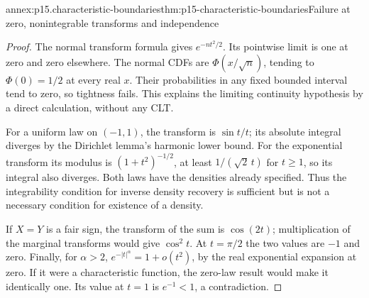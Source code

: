 \begin{annexitem}{annex:p15.characteristic-boundaries}{thm:p15-characteristic-boundaries}{Failure at zero, nonintegrable transforms and independence}
\begin{proof}
The normal transform formula gives \(e^{-nt^2/2}\).
Its pointwise limit is one at zero and zero elsewhere.
The normal CDFs are \(\Phi(x/\sqrt n)\), tending
to \(\Phi(0)=1/2\) at every real \(x\).
Their probabilities in any fixed bounded interval
tend to zero, so tightness fails. This explains
the limiting continuity hypothesis by a direct
calculation, without any CLT.

For a uniform law on \((-1,1)\), the transform is
\(\sin t/t\); its absolute integral diverges by
the Dirichlet lemma's harmonic lower bound.
For the exponential transform its modulus is
\((1+t^2)^{-1/2}\), at least \(1/(\sqrt2\,t)\)
for \(t\geq1\), so its integral also diverges.
Both laws have the densities already specified.
Thus the integrability condition for inverse
density recovery is sufficient but is not a
necessary condition for existence of a density.

If \(X=Y\) is a fair sign, the transform of
the sum is \(\cos(2t)\); multiplication of
the marginal transforms would give \(\cos^2t\).
At \(t=\pi/2\) the two values are \(-1\) and zero.
Finally, for \(\alpha>2\),
\(e^{-|t|^\alpha}=1+o(t^2)\), by the real exponential
expansion at zero. If it were a characteristic
function, the zero-law result would make it
identically one. Its value at \(t=1\) is \(e^{-1}<1\),
a contradiction.
\end{proof}
\end{annexitem}
